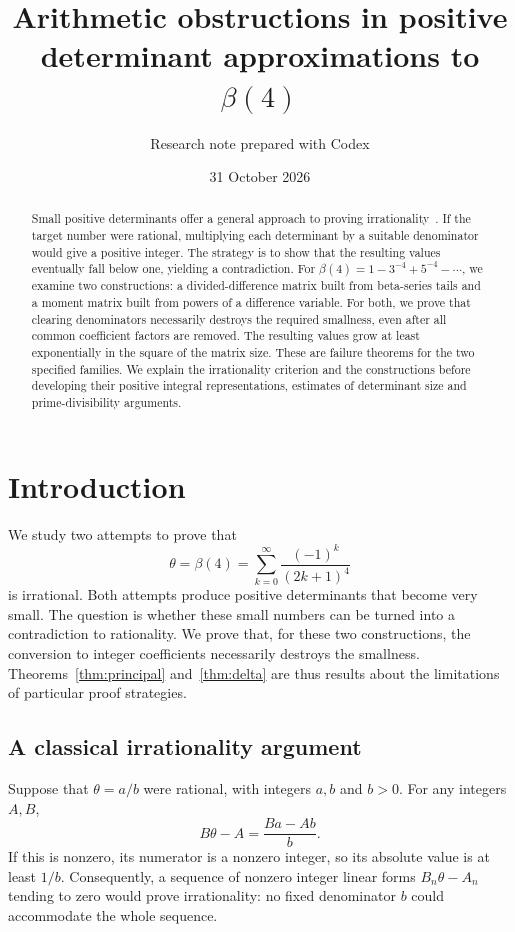 \documentclass[11pt]{article}
\title{Arithmetic obstructions in positive determinant\newline
approximations to $\beta(4)$}
\author{\normalsize Research note prepared with Codex}
\date{31 October 2026}
\theoremstyle{definition}
\theoremstyle{remark}
\numberwithin{equation}{section}
\begin{document}
\maketitle

\begin{abstract}
Small positive determinants offer a general approach to proving
irrationality~\cite{Zudilin}. If the target number were rational,
multiplying each determinant by a suitable denominator would give a
positive integer. The strategy is to show that the resulting values
eventually fall below one, yielding a contradiction.
For $\beta(4)=1-3^{-4}+5^{-4}-\cdots$, we examine two constructions:
a divided-difference matrix built from beta-series tails and a moment
matrix built from powers of a difference variable. For both, we prove
that clearing denominators
necessarily destroys the required smallness, even after all common
coefficient factors are removed. The resulting values grow at least
exponentially in the square of the matrix size. These are failure theorems for the two
specified families. We explain the irrationality criterion and the
constructions before developing their positive integral representations,
estimates of determinant size and prime-divisibility arguments.
\end{abstract}

\section{Introduction}

We study two attempts to prove that
\begin{equation}\label{eq:theta}
 \theta=\beta(4)=\sum_{k=0}^{\infty}\frac{(-1)^k}{(2k+1)^4}
\end{equation}
is irrational. Both attempts produce positive determinants that become
very small. The question is whether these small numbers can be turned
into a contradiction to rationality. We prove that, for these two
constructions, the conversion to integer coefficients necessarily
destroys the smallness. Theorems~\ref{thm:principal} and~\ref{thm:delta}
are thus results about the limitations of particular proof strategies.

\subsection{A classical irrationality argument}

Suppose that $\theta=a/b$ were rational, with integers $a,b$ and $b>0$.
For any integers $A,B$,
\[
 B\theta-A=\frac{Ba-Ab}{b}.
\]
If this is nonzero, its numerator is a nonzero integer, so its absolute
value is at least $1/b$. Consequently, a sequence of nonzero integer
linear forms $B_n\theta-A_n$ tending to zero would prove irrationality:
no fixed denominator $b$ could accommodate the whole sequence.
\end{document}

